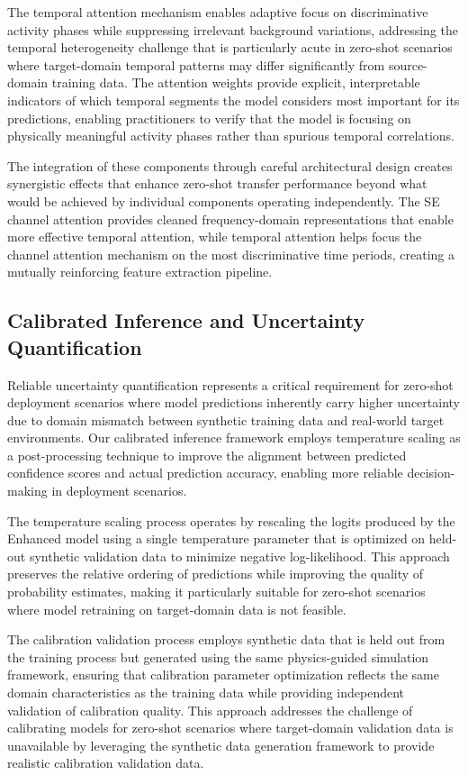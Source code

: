 \documentclass[journal]{IEEEtran}
\begin{document}
The temporal attention mechanism enables adaptive focus on discriminative activity phases while suppressing irrelevant background variations, addressing the temporal heterogeneity challenge that is particularly acute in zero-shot scenarios where target-domain temporal patterns may differ significantly from source-domain training data. The attention weights provide explicit, interpretable indicators of which temporal segments the model considers most important for its predictions, enabling practitioners to verify that the model is focusing on physically meaningful activity phases rather than spurious temporal correlations.

The integration of these components through careful architectural design creates synergistic effects that enhance zero-shot transfer performance beyond what would be achieved by individual components operating independently. The SE channel attention provides cleaned frequency-domain representations that enable more effective temporal attention, while temporal attention helps focus the channel attention mechanism on the most discriminative time periods, creating a mutually reinforcing feature extraction pipeline.

\subsection{Calibrated Inference and Uncertainty Quantification}

Reliable uncertainty quantification represents a critical requirement for zero-shot deployment scenarios where model predictions inherently carry higher uncertainty due to domain mismatch between synthetic training data and real-world target environments. Our calibrated inference framework employs temperature scaling as a post-processing technique to improve the alignment between predicted confidence scores and actual prediction accuracy, enabling more reliable decision-making in deployment scenarios.

The temperature scaling process operates by rescaling the logits produced by the Enhanced model using a single temperature parameter that is optimized on held-out synthetic validation data to minimize negative log-likelihood. This approach preserves the relative ordering of predictions while improving the quality of probability estimates, making it particularly suitable for zero-shot scenarios where model retraining on target-domain data is not feasible.

The calibration validation process employs synthetic data that is held out from the training process but generated using the same physics-guided simulation framework, ensuring that calibration parameter optimization reflects the same domain characteristics as the training data while providing independent validation of calibration quality. This approach addresses the challenge of calibrating models for zero-shot scenarios where target-domain validation data is unavailable by leveraging the synthetic data generation framework to provide realistic calibration validation data.
\end{document}
